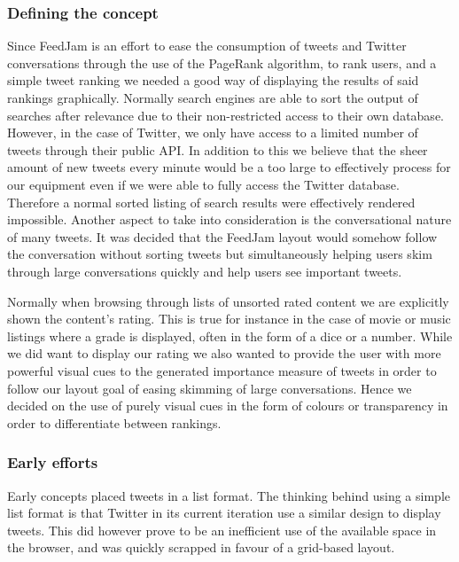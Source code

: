 \subsubsection{Defining the concept}
Since FeedJam is an effort to ease the consumption of tweets and Twitter conversations through the use of the PageRank algorithm, to rank users, and a simple tweet ranking we needed a good way of displaying the results of said rankings graphically. Normally search engines are able to sort the output of searches after relevance due to their non-restricted access to their own database. However, in the case of Twitter, we only have access to a limited number of tweets through their public API. In addition to this we believe that the sheer amount of new tweets every minute would be a too large to effectively process for our equipment even if we were able to fully access the Twitter database. Therefore a normal sorted listing of search results were effectively rendered impossible. Another aspect to take into consideration is the conversational nature of many tweets. It was decided that the FeedJam layout would somehow follow the conversation without sorting tweets but simultaneously helping users skim through large conversations quickly and help users see important tweets.

Normally when browsing through lists of unsorted rated content we are explicitly shown the content's rating. This is true for instance in the case of movie or music listings where a grade is displayed, often in the form of a dice or a number. While we did want to display our rating we also wanted to provide the user with more powerful visual cues to the generated importance measure of tweets in order to follow our layout goal of easing skimming of large conversations. Hence we decided on the use of purely visual cues in the form of colours or transparency in order to differentiate between rankings.

\subsubsection{Early efforts}
Early concepts placed tweets in a list format. The thinking behind using a simple list format is that Twitter in its current iteration use a similar design to display tweets. This did however prove to be an inefficient use of the available space in the browser, and was quickly scrapped in favour of a grid-based layout.

